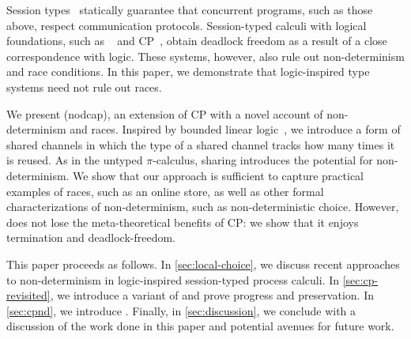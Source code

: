 \documentclass[UKenglish]{llncs}
\begin{document}
Session types~\parencite{honda1993} statically guarantee that concurrent
programs, such as those above, respect communication protocols.
Session-typed calculi with logical foundations, such as
\piDILL~\parencite{caires2010} and CP~\parencite{wadler2012}, obtain deadlock freedom as a
result of a close correspondence with logic.
These systems, however, also rule out non-determinism and race conditions. In
this paper, we demonstrate that logic-inspired type systems need not rule out
races.

We present \nodcap (nodcap), an extension of CP with a novel account of
non-determinism and races.
Inspired by bounded linear logic~\parencite{girard1992}, we introduce a form of
shared channels in which the type of a shared channel tracks how many times it
is reused.
As in the untyped $\pi$-calculus, sharing introduces the potential for
non-determinism.
We show that our approach is sufficient to capture practical examples of races,
such as an online store, as well as other formal characterizations of
non-determinism, such as non-deterministic choice.  However, \nodcap does not
lose the meta-theoretical benefits of CP: we show that it enjoys termination and
deadlock-freedom.

This paper proceeds as follows.
In \cref{sec:local-choice}, we discuss recent approaches to non-determinism in
logic-inspired session-typed process calculi.
In \cref{sec:cp-revisited}, we introduce a variant of \cp and prove progress and
preservation.
In \cref{sec:cpnd}, we introduce \nodcap.
Finally, in \cref{sec:discussion}, we conclude with a discussion of the work
done in this paper and potential avenues for future work.
\end{document}
